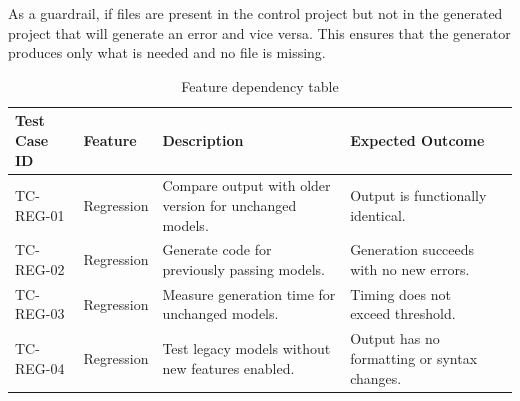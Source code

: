 As a guardrail, if files are present in the control project but not in the generated project that will generate an error and vice versa. This ensures that the generator produces only what is needed and no file is missing.

\bgroup
{}
\begin{xltabular}{\textwidth}{X X X X X}
\caption{Feature dependency table}
\label{tab:reg_tests_1}\\
\toprule
{}%
Test Case ID & Feature & Description & Expected Outcome \\
\midrule
TC-REG-01 & Regression & Compare output with older version for unchanged models. & Output is functionally identical. \\
TC-REG-02 & Regression & Generate code for previously passing models. & Generation succeeds with no new errors. \\
TC-REG-03 & Regression & Measure generation time for unchanged models. & Timing does not exceed threshold. \\
TC-REG-04 & Regression & Test legacy models without new features enabled. & Output has no formatting or syntax changes. \\
\end{xltabular}




